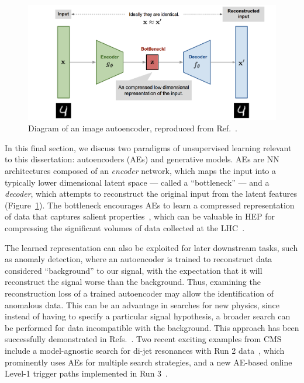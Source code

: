 \begin{figure}[ht]
    \centering
    \captionsetup{justification=centering}
    \includegraphics[width=\textwidth]{figures/03-ML/autoencoder-architecture.png}
    \caption{Diagram of an image autoencoder, reproduced from Ref.~\cite{weng2018VAE}.}
    \label{fig:03_ml_autoencoder}
\end{figure}

In this final section, we discuss two paradigms of unsupervised learning relevant to this dissertation: autoencoders (AEs) and generative models.
AEs are NN architectures composed of an \textit{encoder} network, which maps the input into a typically lower dimensional latent space --- called a ``bottleneck'' --- and a \textit{decoder}, which attempts to reconstruct the original input from the latent features (Figure~\ref{fig:03_ml_autoencoder}).
The bottleneck encourages AEs to learn a compressed representation of data that captures salient properties~\cite{autoencoders}, which can be valuable in HEP for compressing the significant volumes of data collected at the LHC~\cite{Guglielmo}.

The learned representation can also be exploited for later downstream tasks, such as anomaly detection, where an autoencoder is trained to reconstruct data considered ``background'' to our signal, with the expectation that it will reconstruct the signal worse than the background.
Thus, examining the reconstruction loss of a trained autoencoder may allow the identification of anomalous data.
This can be an advantage in searches for new physics, since instead of having to specify a particular signal hypothesis, a broader search can be performed for data incompatible with the background.
This approach has been successfully demonstrated in Refs.~\cite{Heimel:2018mkt,Farina-anomaly,Cerri:2018anq,Finke-anomaly,Kasieczka:2021xcg,Govorkova:2021utb,Pol:2020weg,Ngairangbam:2021yma,Dillon-lower-dimension}.
Two recent exciting examples from CMS include a model-agnostic search for di-jet resonances with Run 2 data~\cite{CMS-PAS-EXO-22-026}, which prominently uses AEs for multiple search strategies, and a new AE-based online Level-1 trigger paths implemented in Run 3~\cite{CMS-DP-2023-079, CMS-DP-2024-059}.

